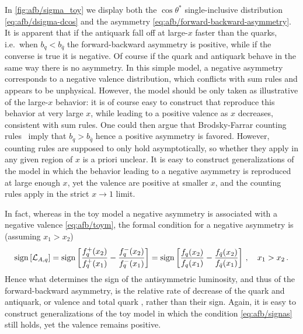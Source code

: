 In \cref{fig:afb/sigma_toy} we display both the $\cos\theta^*$
single-inclusive distribution \cref{eq:afb/dsigma-dcos} and
the asymmetry \cref{eq:afb/forward-backward-asymmetry}.
%
It is apparent that if the  antiquark \pdfs fall off at large-$x$ faster than
the quarks, i.e.\ when $b_q < b_{\bar{q}}$ the forward-backward
asymmetry is positive, while if the converse is true it is
negative. Of course if the quark and antiquark \pdfs behave in the same
way there is no asymmetry.
%
In this simple model, a negative asymmetry corresponds to a negative
valence distribution, which conflicts with sum rules and appears to be
unphysical. However, the model should be only taken as illustrative of
the large-$x$ behavior: it is of course easy to construct \pdfs that
reproduce this behavior at very large $x$, while leading to a positive
valence \pdf as $x$ decreases, consistent with sum rules. One could then argue that
Brodsky-Farrar counting rules~\cite{Brodsky:1973kr,Brodsky:1974vy}
imply that  $b_q > b_{\bar{q}}$
hence a positive asymmetry is favored.
%
However,
counting rules are supposed to only hold asymptotically, so whether
they apply in any given region of $x$ is a priori unclear.
%
It is easy
to construct generalizations of the model in which the behavior
leading to a negative asymmetry is reproduced at large enough $x$, yet
the valence \pdfs are positive at smaller $x$, and the counting rules
apply in the strict $x\to1$ limit.

In fact, whereas in the toy model a negative asymmetry is
associated with a negative valence
\cref{eq:afb/toym}, the formal condition for a negative asymmetry is
(assuming $x_1>x_2$)
\begin{equation}\label{eq:afb/signas}
   \operatorname{sign}\left[\mathcal{L}_{A,q}\right]=\operatorname{sign}\left[\frac{ f_q^+(x_2)}{
       f_q^+(x_1)}-\frac{
       f_q^-(x_2)}{f_q^-(x_1)}\right]=\operatorname{sign}\left[\frac{ f_q(x_2)}{
       f_q(x_1)}-\frac{f_{\bar{q}}(x_2)}{f_{\bar{q}}(x_1)}\right] \, , \quad x_1>x_2 \,.
\end{equation}
Hence what determines the sign of the antisymmetric luminosity, and thus
of the forward-backward asymmetry, is the relative rate of decrease of
the quark and antiquark, or valence and total quark \pdfs, rather than
their sign. Again, it is easy to construct generalizations of the
toy model in which the condition \cref{eq:afb/signas} still holds,  yet
the valence \pdf remains positive.

